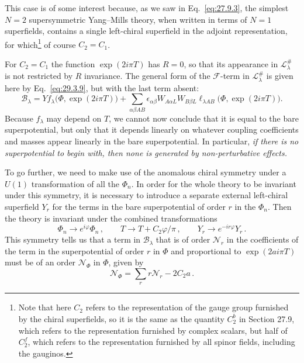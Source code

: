 This case is of some interest because, as we saw in
Eq.~\eqref{eq:27.9.3}, the simplest \(N=2\) supersymmetric Yang--Mills
theory, when written in terms of \(N=1\) superfields, contains a single
left-chiral superfield in the adjoint representation, for
which\footnote{Note that here \(C_2\) refers to the representation of the
gauge group furnished by the chiral superfields, so it is the same as the
quantity \(C_2^b\) in Section 27.9, which refers to the representation
furnished by complex scalars, but half of \(C_2^f\), which refers to the
representation furnished by all spinor fields, including the gauginos.}
of course \(C_2=C_1\).

For \(C_2=C_1\) the function \(\exp(2i\pi T)\) has \(R=0\), so that its
appearance in \(\mathcal{L}^{\#}_\lambda\) is not restricted by \(R\)
invariance. The general form of the \(\mathcal{F}\)-term in
\(\mathcal{L}^{\#}_\lambda\) is given here by Eq.~\eqref{eq:29.3.9}, but
with the last term absent:
\begin{equation}
  \mathcal{B}_\lambda
  =
  Yf_\lambda\bigl(\Phi,\exp(2i\pi T)\bigr)
  +\sum_{\alpha\beta AB}
  \epsilon_{\alpha\beta}W_{A\alpha L}W_{B\beta L}
  \ell_{\lambda AB}\bigl(\Phi,\exp(2i\pi T)\bigr).
  \tag{29.3.32}\label{eq:29.3.32}
\end{equation}
Because \(f_\lambda\) may depend on \(T\), we cannot now conclude that it
is equal to the bare superpotential, but only that it depends linearly on
whatever coupling coefficients and masses appear linearly in the bare
superpotential. In particular, \emph{if there is no superpotential to
begin with, then none is generated by non-perturbative effects.}

To go further, we need to make use of the anomalous chiral symmetry under a
\(U(1)\) transformation of all the \(\Phi_n\). In order for the whole
theory to be invariant under this symmetry, it is necessary to introduce a
separate external left-chiral superfield \(Y_r\) for the terms in the bare
superpotential of order \(r\) in the \(\Phi_n\). Then the theory is
invariant under the combined transformations
\begin{equation}
  \Phi_n\longrightarrow e^{i\varphi}\Phi_n\,,
  \qquad
  T\longrightarrow T+C_2\varphi/\pi\,,
  \qquad
  Y_r\longrightarrow e^{-ir\varphi}Y_r\,.
  \tag{29.3.33}\label{eq:29.3.33}
\end{equation}
This symmetry tells us that a term in \(\mathcal{B}_\lambda\) that is of
order \(\mathcal{N}_r\) in the coefficients of the term in the
superpotential of order \(r\) in \(\Phi\) and proportional to
\(\exp(2ai\pi T)\) must be of an order \(\mathcal{N}_\Phi\) in \(\Phi\),
given by
\begin{equation}
  \mathcal{N}_\Phi
  =
  \sum_r r\mathcal{N}_r-2C_2a\,.
  \tag{29.3.34}\label{eq:29.3.34}
\end{equation}

